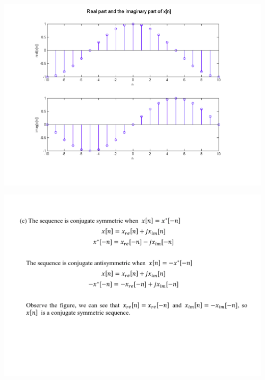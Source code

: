 \documentclass[a4paper]{article}
\begin{document}
	\begin{center}
		\includegraphics[width=1\linewidth]{screenshot007}
	\end{center}
	
	\begin{center}
		\includegraphics[width=1\linewidth]{screenshot008}
	\end{center}
	
	\newpage
	
	
	
\end{document}
